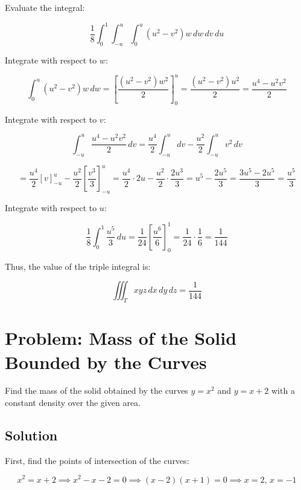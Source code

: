\documentclass{article}
\begin{document}
Evaluate the integral:



\[
\frac{1}{8} \int_{0}^{1} \int_{-u}^{u} \int_{0}^{u} (u^2 - v^2) w \, dw \, dv \, du
\]



Integrate with respect to \( w \):



\[
\int_{0}^{u} (u^2 - v^2) w \, dw = \left[ \frac{(u^2 - v^2) w^2}{2} \right]_{0}^{u} = \frac{(u^2 - v^2) u^2}{2} = \frac{u^4 - u^2 v^2}{2}
\]



Integrate with respect to \( v \):



\[
\int_{-u}^{u} \frac{u^4 - u^2 v^2}{2} \, dv = \frac{u^4}{2} \int_{-u}^{u} dv - \frac{u^2}{2} \int_{-u}^{u} v^2 \, dv
\]




\[
= \frac{u^4}{2} \left[ v \right]_{-u}^{u} - \frac{u^2}{2} \left[ \frac{v^3}{3} \right]_{-u}^{u} = \frac{u^4}{2} \cdot 2u - \frac{u^2}{2} \cdot \frac{2u^3}{3} = u^5 - \frac{2u^5}{3} = \frac{3u^5 - 2u^5}{3} = \frac{u^5}{3}
\]



Integrate with respect to \( u \):



\[
\frac{1}{8} \int_{0}^{1} \frac{u^5}{3} \, du = \frac{1}{24} \left[ \frac{u^6}{6} \right]_{0}^{1} = \frac{1}{24} \cdot \frac{1}{6} = \frac{1}{144}
\]



Thus, the value of the triple integral is:



\[
\iiint_{T} x y z \, dx \, dy \, dz = \frac{1}{144}
\]



\section*{Problem: Mass of the Solid Bounded by the Curves}
Find the mass of the solid obtained by the curves \( y = x^2 \) and \( y = x + 2 \) with a constant density over the given area.

\subsection*{Solution}
First, find the points of intersection of the curves:


\[
x^2 = x + 2 \implies x^2 - x - 2 = 0 \implies (x - 2)(x + 1) = 0 \implies x = 2, \, x = -1
\]
\end{document}
